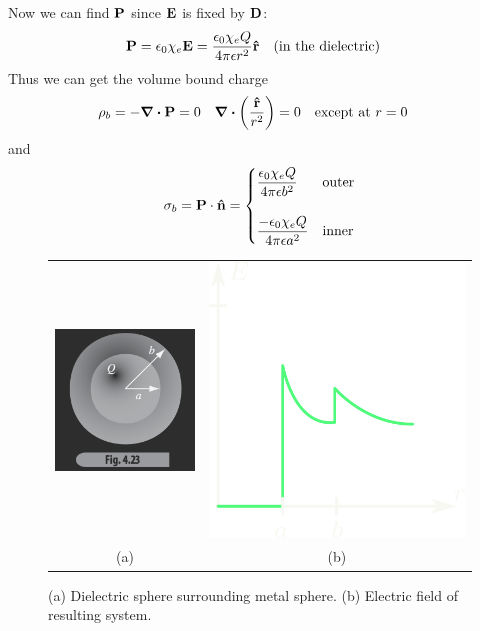 \documentclass[../main.tex]{subfiles}
\begin{document}
Now we can find $\vb P$ since $\vb E$ is fixed by $\vb D$:
\begin{align*}
    \vb P = \epsilon_0 \chi_e \vb E = \frac{\epsilon_0 \chi_e Q}{4\pi \epsilon r^2} \vu r \qqtext{(in the dielectric)}
\end{align*}
Thus we can get the volume bound charge 
\begin{align*}
    \rho_b = -\div \vb P = 0 \quad \div(\frac{\vu r}{r^2}) = 0 \qqtext{except at $r = 0$}
\end{align*}
and
\begin{align*}
    \sigma_b = \vb P \cdot \vu n = \begin{cases}
        \dfrac{\epsilon_0 \chi_e Q}{4\pi \epsilon b^2} & \text{outer} \\ \\
        \dfrac{-\epsilon_0 \chi_e Q}{4\pi \epsilon a^2} & \text{inner}
    \end{cases}
\end{align*}

\begin{figure}[ht]
    \centering
    \begin{tabular}{cc}
        \includegraphics[width=0.3\linewidth]{fig4_23.png} & \includegraphics[width=0.3\linewidth]{fig4_23b.png} \\
        (a) & (b)
    \end{tabular}
    \caption{(a) Dielectric sphere surrounding metal sphere. (b) Electric field of resulting system.}
    \label{fig:4_23}
\end{figure}
\end{document}
